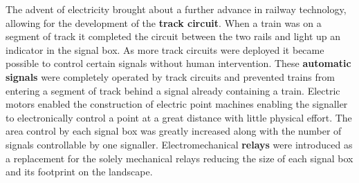 \begin{comment}
Around about the same time as the introduction of the semaphore signal, the system
for controlling the signals went under drastic change. The Policemen were
replaced with professional \textbf{Signallers} whose job was specifically to
manage the railways. A system of pulleys, wires and levers was also devised
to allow multiple signals and points to be controlled from a central
position. This central position became known as a \textbf{signal box} and was
manned by one or more signallers. This centralisation allowed for further
safety mechanisms to be installed. One in particular, namely the \textbf{interlocking},
is of interest to us. The interlocking physically locked levers if they were
unsafe to move.
\end{comment}
The advent of electricity brought about a further advance in railway technology, allowing for the development of the \textbf{track circuit}. When a train was on a segment of track it completed the circuit between the two rails and light up an indicator in the signal box. As more track circuits were deployed it became possible to control certain signals without human intervention. These \textbf{automatic signals} were completely operated by track circuits and prevented trains from entering a segment of track behind a signal already containing a train. Electric motors enabled the construction of electric point machines enabling the signaller to electronically control a point at a great distance with little physical effort. The area control by each signal box was greatly increased along with the number of signals controllable by one signaller. Electromechanical \textbf{relays} were introduced as a replacement for the solely mechanical relays reducing the size of each signal box and its footprint on the landscape.
\begin{comment}
The next leap in railway technology came from the invention of the electronic
\textbf{track circuit}. These would activate an indicator in the signal box if a
segment of track was occupied by a train. As more and more track circuits
became installed it was no longer necessary to have human intervention to
control certain signals. \textbf{Automatic signals} were introduced which
operated completely by track circuits without any intervention from human
signallers. Around this time \textbf{electric point machines} were introduced
removing a large amount of physical work performed by signallers allowing for
a greater area of control for each signaller.  Around this time
electromechanical \textbf{relays} began to replace purely mechanical relays
reducing the amount of space needed for a signal box.
\end{comment}

